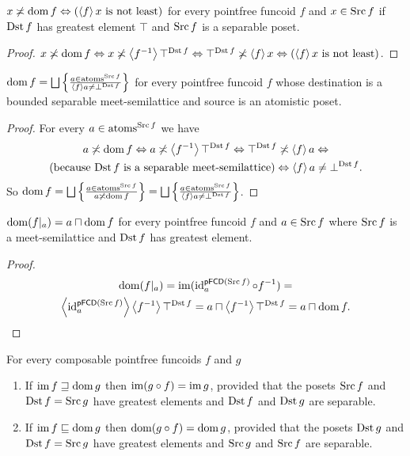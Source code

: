 \begin{prop}
$x\nasymp\dom f\Leftrightarrow(\supfun fx\text{ is not least})$ for
every pointfree funcoid $f$ and $x\in\Src f$ if $\Dst f$ has greatest
element $\top$ and $\Src f$ is a separable poset.\end{prop}
\begin{proof}
$x\nasymp\dom f\Leftrightarrow x\nasymp\supfun{f^{-1}}\top^{\Dst f}\Leftrightarrow\top^{\Dst f}\nasymp\supfun fx\Leftrightarrow(\supfun fx\text{ is not least})$.\end{proof}
\begin{prop}
$\dom f=\bigsqcup\setcond{a\in\atoms^{\Src f}}{\supfun fa\ne\bot^{\Dst f}}$
for every pointfree funcoid $f$ whose destination is a bounded separable meet-semilattice
and source is an atomistic poset.\end{prop}
\begin{proof}
For every $a\in\atoms^{\Src f}$ we have 
\begin{multline*}
a\nasymp\dom f\Leftrightarrow a\nasymp\supfun{f^{-1}}\top^{\Dst f}\Leftrightarrow\top^{\Dst f}\nasymp\supfun fa\Leftrightarrow\\
\text{(because $\Dst f$ is a separable meet-semilattice)}\Leftrightarrow\supfun fa\ne\bot^{\Dst f}.
\end{multline*}
So $\dom f=\bigsqcup\setcond{a\in\atoms^{\Src f}}{a\nasymp\dom f}=\bigsqcup\setcond{a\in\atoms^{\Src f}}{\supfun fa\ne\bot^{\Dst f}}$.\end{proof}
\begin{prop}
$\dom(f|_{a})=a\sqcap\dom f$ for every pointfree funcoid $f$ and
$a\in\Src f$ where $\Src f$ is a meet-semilattice and
$\Dst f$ has greatest element.\end{prop}
\begin{proof}
~
\begin{multline*}
\dom(f|_{a})=\im(\id_{a}^{\mathsf{pFCD}(\Src f)}\circ f^{-1})=\\
\supfun{\id_{a}^{\mathsf{pFCD}(\Src f)}}\supfun{f^{-1}}\top^{\Dst f}=a\sqcap\supfun{f^{-1}}\top^{\Dst f}=a\sqcap\dom f.
\end{multline*}
\end{proof}
\begin{prop}
For every composable pointfree funcoids $f$ and $g$
\begin{enumerate}
\item \label{pf-im-ge-dom}If $\im f\sqsupseteq\dom g$ then $\im(g\circ f)=\im g$, provided that
the posets $\Src f$ and $\Dst f=\Src g$ have greatest elements and $\Dst f$
and $\Dst g$ are separable.
\item \label{pf-im-le-dom}If $\im f\sqsubseteq\dom g$ then $\dom(g\circ f)=\dom g$, provided that
the posets $\Dst g$ and $\Dst f=\Src g$ have greatest elements and $\Src g$
and $\Src f$ are separable.
\end{enumerate}
\end{prop}
